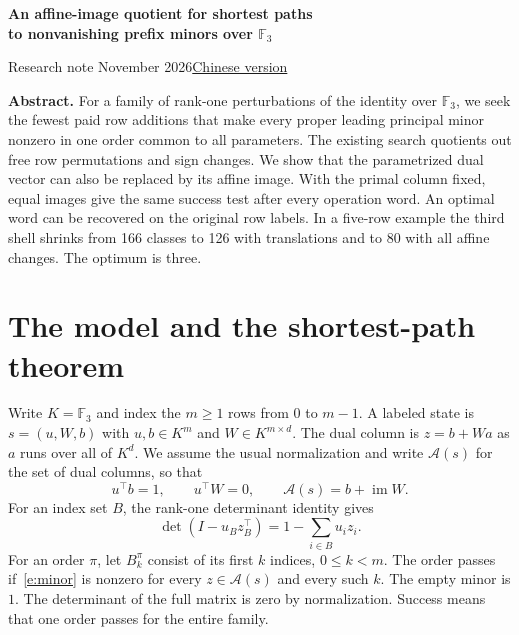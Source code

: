 \documentclass[UTF8,a4paper,11pt,scheme=plain]{ctexart}
\theoremstyle{zh}
\theoremstyle{plain}
\newcommand{\F}{\mathbb F_3}
\newcommand{\A}{\mathcal A}
\newcommand{\im}{\operatorname{im}}
\newcommand{\stateeq}{u^\top b=1,\qquad u^\top W=0,\qquad \A(s)=b+\im W.}
\newcommand{\minoreq}{\det (I-u_B z_B^\top)=1-\sum_{i\in B}u_i z_i.}
\begin{document}
\clearpage
\normalsize
{}
\setcounter{section}{0}\setcounter{equation}{0}
\renewcommand*{\theHsection}{en.\arabic{section}}
\renewcommand*{\theHequation}{en.\arabic{equation}}
\renewcommand{\proofname}{Proof}
\renewcommand{\refname}{References}
\setlength{\parindent}{1.5em}
\begin{center}
  {\sffamily\bfseries\fontsize{17}{22}\selectfont
  An affine-image quotient for shortest paths\\
  to nonvanishing prefix minors over $\F$\par}
  \vspace{.5em}
  {\small Research note November 2026\qquad\hyperlink{edition-zh.0}{Chinese version}}
\end{center}
\noindent\textbf{Abstract.}\quad
For a family of rank-one perturbations of the identity over $\F$, we seek the fewest paid row
additions that make every proper leading principal minor nonzero in one order common to all
parameters. The existing search quotients out free row permutations and sign changes. We show
that the parametrized dual vector can also be replaced by its affine image. With the primal
column fixed, equal images give the same success test after every operation word. An optimal
word can be recovered on the original row labels. In a five-row example the third shell shrinks
from 166 classes to 126 with translations and to 80 with all affine changes. The optimum is three.

\section{The model and the shortest-path theorem}
Write $K=\F$ and index the $m\ge1$ rows from $0$ to $m-1$. A labeled state is
$s=(u,W,b)$ with $u,b\in K^m$ and $W\in K^{m\times d}$. The dual column is $z=b+Wa$
as $a$ runs over all of $K^d$. We assume the usual normalization and write $\A(s)$ for the
set of dual columns, so that
\begin{equation}\label{e:state}\stateeq\end{equation}
For an index set $B$, the rank-one determinant identity gives
\begin{equation}\label{e:minor}\minoreq\end{equation}
For an order $\pi$, let $B_k^\pi$ consist of its first $k$ indices, $0\le k<m$.
The order passes if~\eqref{e:minor} is nonzero for every $z\in\A(s)$ and every such $k$.
The empty minor is $1$. The determinant of the full matrix is zero by normalization.
Success means that one order passes for the entire family.
\end{document}
